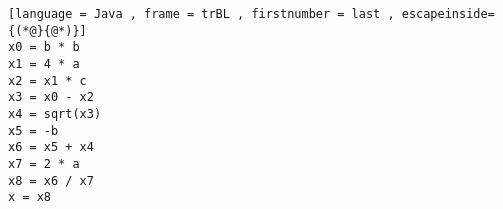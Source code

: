 \begin{lstlisting}[language = Java , frame = trBL , firstnumber = last , escapeinside={(*@}{@*)}]
x0 = b * b
x1 = 4 * a
x2 = x1 * c
x3 = x0 - x2
x4 = sqrt(x3)
x5 = -b
x6 = x5 + x4
x7 = 2 * a
x8 = x6 / x7
x = x8
\end{lstlisting}